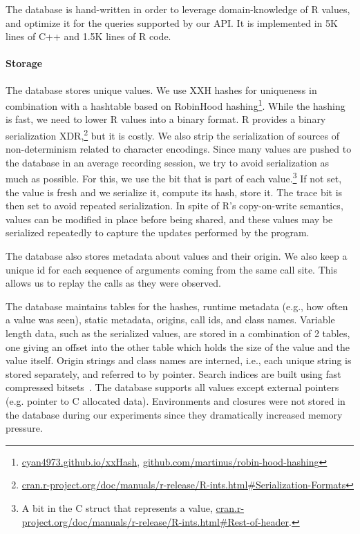 \documentclass[sigplan,nonacm,anonymous,review]{acmart}
\begin{document}
The database is hand-written in order to leverage domain-knowledge of
R values, and optimize it for the queries supported by our API.  It is
implemented in 5K lines of C++ and 1.5K lines of R code.

\paragraph{Storage}


The database stores unique values.  We use XXH hashes for
uniqueness in combination with a hashtable based on RobinHood
hashing\footnote{\url{cyan4973.github.io/xxHash},
\url{github.com/martinus/robin-hood-hashing}}.  While the hashing is
fast, we need to lower R values into a binary format.  R provides a
binary serialization XDR,\footnote{\url{cran.r-project.org/doc/manuals/r-release/R-ints.html\#Serialization-Formats}} but it is
costly.
We also strip the serialization of sources of non-determinism related
to character encodings.  Since many values are pushed to the database
in an average recording session, we try to avoid serialization as much
as possible.  For this, we use the  bit that is part of
each value.\footnote{A bit in the C struct that represents a value,
	\url{cran.r-project.org/doc/manuals/r-release/R-ints.html\#Rest-of-header}.}
If not set, the value is fresh and we serialize it, compute its hash,
store it. The trace bit is then set to avoid repeated serialization.
In spite of R's copy-on-write semantics, values can be modified in
place before being shared, and these values may be serialized repeatedly
to capture the updates performed by the program.

The database also stores metadata about values and their origin.  We
also keep a unique id for each sequence of arguments coming from the
same call site. This allows us to replay the calls as they were
observed.

The database maintains tables for the hashes, runtime metadata (e.g.,
how often a value was seen), static metadata, origins, call ids, and
class names.  Variable length data, such as the serialized values, are
stored in a combination of 2 tables, one giving an offset into the
other table which holds the size of the value and the value itself.
Origin strings and class names are interned, i.e., each unique string
is stored separately, and referred to by pointer.  Search indices are
built using fast compressed bitsets~\cite{chambi2016better}.  The
database supports all values except external pointers (e.g. pointer to
C allocated data).  Environments and closures were not stored in the
database during our experiments since they dramatically increased
memory pressure.
\end{document}
